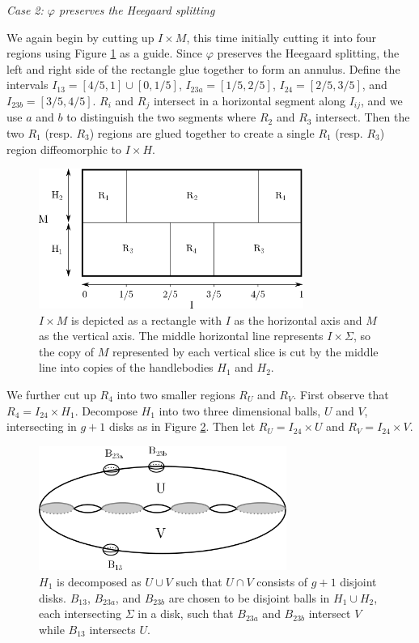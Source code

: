 \documentclass[12pt]{amsart}
\theoremstyle{definition}
\theoremstyle{remark}
\begin{document}
\smallskip
\noindent\textit{Case 2: $\varphi$ preserves the Heegaard splitting}\ \

We again begin by cutting up $I \times M$, this time initially cutting it into four regions using Figure \ref{preservebreakdown} as a guide.
Since $\varphi$ preserves the Heegaard splitting, the left and right side of the rectangle glue together to form an annulus.
Define the intervals $I_{13} = [4/5,1] \cup [0,1/5]$, $I_{23a} = [1/5,2/5]$, $I_{24} = [2/5,3/5]$, and $I_{23b} = [3/5,4/5]$.
$R_i$ and $R_j$ intersect in a horizontal segment along $I_{ij}$, and we use $a$ and $b$ to distinguish the two segments where $R_2$ and $R_3$ intersect.
Then the two $R_1$ (resp.
$R_3$) regions are glued together to create a single $R_1$ (resp.
$R_3$) region diffeomorphic to $I \times H$.


\begin{figure}[h]
\centering
\includegraphics[height=1.8in]{MxS1_preserves.png}
\caption{$I \times M$ is depicted as a rectangle with $I$ as the horizontal axis and $M$ as the vertical axis.
The middle horizontal line represents $I \times \Sigma$, so the copy of $M$ represented by each vertical slice is cut by the middle line into copies of the handlebodies $H_1$ and $H_2$.}
\label{preservebreakdown}
\end{figure}

We further cut up $R_4$ into two smaller regions $R_U$ and $R_V$.
First observe that $R_4 = I_{24} \times H_1$.
Decompose $H_1$ into two three dimensional balls, $U$ and $V$, intersecting in $g+1$ disks as in Figure \ref{fig_disjointballs}.
Then let $R_U = I_{24}  \times U$ and $R_V = I_{24} \times V$.


\begin{figure}[h]
\centering
\includegraphics[height=1.6in]{disjointballs.png}
\caption{$H_1$ is decomposed as $U \cup V$ such that $U \cap V$ consists of $g+1$ disjoint disks.
$B_{13}$, $B_{23a}$, and $B_{23b}$ are chosen to be disjoint balls in $H_1 \cup H_2$, each intersecting $\Sigma$ in a disk, such that $B_{23a}$ and $B_{23b}$ intersect $V$ while $B_{13}$ intersects $U$.}
\label{fig_disjointballs}
\end{figure}
\end{document}
